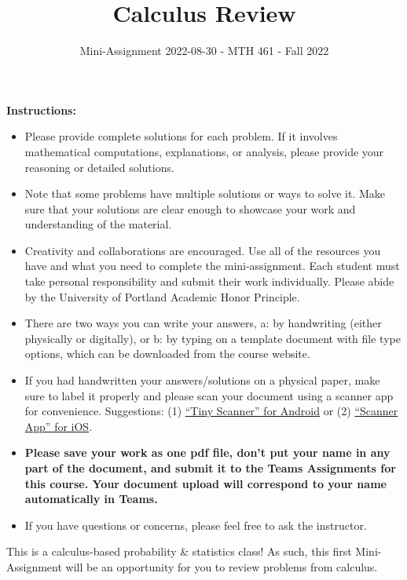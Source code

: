 \documentclass[
]{article}
\title{\textbf{Calculus Review}}
\subtitle{Mini-Assignment 2022-08-30 - MTH 461 - Fall 2022}
\author{}
\date{\vspace{-2.5em}}
\begin{document}
\maketitle

\hfill\break

\textbf{Instructions:}

\begin{itemize}
\item
  Please provide complete solutions for each problem. If it involves mathematical computations, explanations, or analysis, please provide your reasoning or detailed solutions.
\item
  Note that some problems have multiple solutions or ways to solve it. Make sure that your solutions are clear enough to showcase your work and understanding of the material.
\item
  Creativity and collaborations are encouraged. Use all of the resources you have and what you need to complete the mini-assignment. Each student must take personal responsibility and submit their work individually. Please abide by the University of Portland Academic Honor Principle.
\item
  There are two ways you can write your answers, a: by handwriting (either physically or digitally), or b: by typing on a template document with file type options, which can be downloaded from the course website.
\item
  If you had handwritten your answers/solutions on a physical paper, make sure to label it properly and please scan your document using a scanner app for convenience. Suggestions: (1) \href{https://play.google.com/store/apps/details?id=com.appxy.tinyscanner\&hl=en_US\&gl=US}{``Tiny Scanner'' for Android} or (2) \href{https://apps.apple.com/us/app/scanner-app-scan-pdf-document/id595563753}{``Scanner App'' for iOS}.
\item
  \textbf{Please save your work as one pdf file, don't put your name in any part of the document, and submit it to the Teams Assignments for this course. Your document upload will correspond to your name automatically in Teams.}
\item
  If you have questions or concerns, please feel free to ask the instructor.
\end{itemize}

\newpage

This is a calculus-based probability \& statistics class! As such, this first Mini-Assignment will be an opportunity for you to review problems from calculus.
\end{document}
